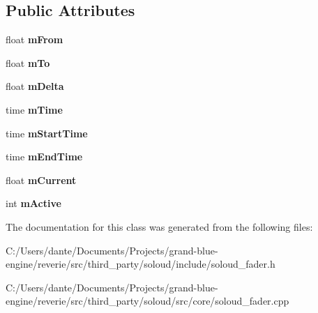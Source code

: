 \subsection*{Public Attributes}
\begin{DoxyCompactItemize}
\item 
\mbox{\label{class_so_loud_1_1_fader_a96a14cb384b0b5a6da2f822aeb771f66}} 
float {\bfseries m\+From}
\item 
\mbox{\label{class_so_loud_1_1_fader_ab83ca38acdf6a04538c041c9c1fd7f13}} 
float {\bfseries m\+To}
\item 
\mbox{\label{class_so_loud_1_1_fader_a99ec0e7cf010c0e3e86998841cfea7e5}} 
float {\bfseries m\+Delta}
\item 
\mbox{\label{class_so_loud_1_1_fader_a6bc8f56f9bd609a34438e427fff7a22f}} 
time {\bfseries m\+Time}
\item 
\mbox{\label{class_so_loud_1_1_fader_a56ce1ecbabe751f09263e56254790f2b}} 
time {\bfseries m\+Start\+Time}
\item 
\mbox{\label{class_so_loud_1_1_fader_a5e0de582ca2a1c8feadad998d6dd58e0}} 
time {\bfseries m\+End\+Time}
\item 
\mbox{\label{class_so_loud_1_1_fader_a6cc1d2a5d4e0f411e1742d4586a663fe}} 
float {\bfseries m\+Current}
\item 
\mbox{\label{class_so_loud_1_1_fader_aebf85d7751bb64982fdc3045798315a4}} 
int {\bfseries m\+Active}
\end{DoxyCompactItemize}


The documentation for this class was generated from the following files\+:\begin{DoxyCompactItemize}
\item 
C\+:/\+Users/dante/\+Documents/\+Projects/grand-\/blue-\/engine/reverie/src/third\+\_\+party/soloud/include/soloud\+\_\+fader.\+h\item 
C\+:/\+Users/dante/\+Documents/\+Projects/grand-\/blue-\/engine/reverie/src/third\+\_\+party/soloud/src/core/soloud\+\_\+fader.\+cpp\end{DoxyCompactItemize}
